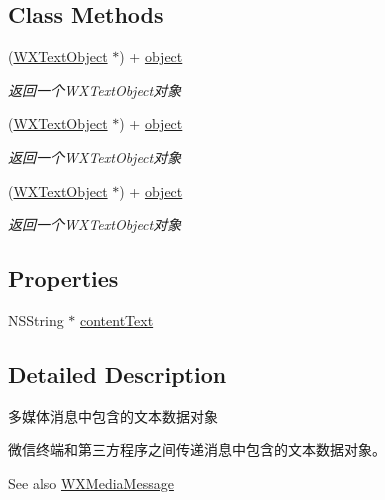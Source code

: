 \subsection*{Class Methods}
\begin{DoxyCompactItemize}
\item 
(\mbox{\hyperlink{interface_w_x_text_object}{W\+X\+Text\+Object}} $\ast$) + \mbox{\hyperlink{interface_w_x_text_object_a810c79d310cac1b35f891eabf5173f20}{object}}
\begin{DoxyCompactList}\small\item\em 返回一个\+W\+X\+Text\+Object对象 \end{DoxyCompactList}\item 
(\mbox{\hyperlink{interface_w_x_text_object}{W\+X\+Text\+Object}} $\ast$) + \mbox{\hyperlink{interface_w_x_text_object_a810c79d310cac1b35f891eabf5173f20}{object}}
\begin{DoxyCompactList}\small\item\em 返回一个\+W\+X\+Text\+Object对象 \end{DoxyCompactList}\item 
(\mbox{\hyperlink{interface_w_x_text_object}{W\+X\+Text\+Object}} $\ast$) + \mbox{\hyperlink{interface_w_x_text_object_a810c79d310cac1b35f891eabf5173f20}{object}}
\begin{DoxyCompactList}\small\item\em 返回一个\+W\+X\+Text\+Object对象 \end{DoxyCompactList}\end{DoxyCompactItemize}
\subsection*{Properties}
\begin{DoxyCompactItemize}
\item 
N\+S\+String $\ast$ \mbox{\hyperlink{interface_w_x_text_object_a2311fbb34b7c0d2520349469b162e28f}{content\+Text}}
\end{DoxyCompactItemize}


\subsection{Detailed Description}
多媒体消息中包含的文本数据对象 

微信终端和第三方程序之间传递消息中包含的文本数据对象。 \begin{DoxySeeAlso}{See also}
\mbox{\hyperlink{interface_w_x_media_message}{W\+X\+Media\+Message}} 
\end{DoxySeeAlso}


